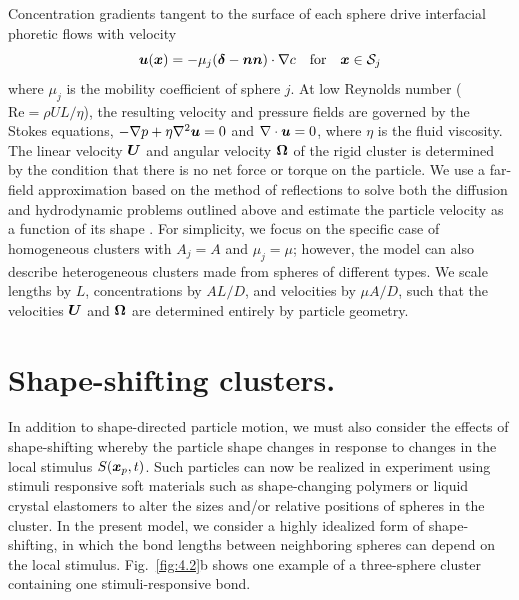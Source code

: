 Concentration gradients tangent to the surface of each sphere drive interfacial phoretic flows with velocity 
\begin{equation}
    \boldsymbol{u}(\boldsymbol{x})=-\mu_j (\boldsymbol{\delta}-\boldsymbol{n}\boldsymbol{n}) \cdot \nabla c\quad \text{for} \quad \boldsymbol{x}\in \mathcal{S}_j
\end{equation}
where  $\mu_j$ is the mobility coefficient of sphere $j$.  At low Reynolds number ($\text{Re}=\rho UL/\eta$), the resulting velocity and pressure fields are governed by the Stokes equations, $-\nabla p + \eta \nabla^2 \boldsymbol{u}=0$ and $\nabla \cdot \boldsymbol{u}=0$, where $\eta$ is the fluid viscosity.  The linear velocity $\boldsymbol{U}$ and angular velocity $\boldsymbol{\Omega}$ of the rigid cluster is determined by the condition that there is no net force or torque on the particle.  We use a far-field approximation based on the method of reflections \cite{varma2018clustering} to solve both the diffusion and hydrodynamic problems outlined above and estimate the particle velocity as a function of its shape \cite{Supp}. For simplicity, we focus on the specific case of homogeneous clusters with $A_j=A$ and $\mu_j=\mu$; however, the model can also describe heterogeneous clusters made from spheres of different types.  We scale lengths by $L$, concentrations by $A L/D$, and velocities by $\mu A/D$, such that the velocities $\boldsymbol{U}$ and $\boldsymbol{\Omega}$ are determined entirely by particle geometry.   

\section{Shape-shifting clusters.}  
In addition to shape-directed particle motion, we must also consider the effects of shape-shifting whereby the particle shape changes in response to changes in the local stimulus $S(\boldsymbol{x}_p,t)$.  Such particles can now be realized in experiment using stimuli responsive soft materials such as shape-changing polymers \cite{magdanz2014stimuli} or liquid crystal elastomers \cite{palagi2016structured} to alter the sizes and/or relative positions of spheres in the cluster.  In the present model, we consider a highly idealized form of shape-shifting, in which the bond lengths between neighboring spheres can depend on the local stimulus.  Fig.\ \ref{fig:4.2}b shows one example of a three-sphere cluster containing one stimuli-responsive bond.

